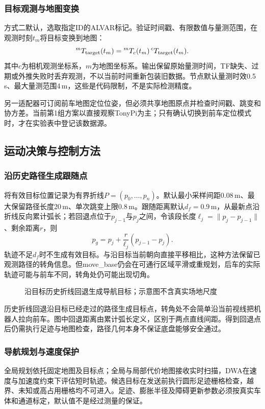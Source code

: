 \subsubsection{目标观测与地图变换}
方式二默认，选取指定ID的ALVAR标记。验证时间戳、有限数值与量测范围，在观测时刻$t_m$将目标变换到地图：
\begin{equation}
{}^{m}T_{\rm target}(t_m)
={}^mT_c(t_m)\,{}^cT_{\rm target}(t_m).
\end{equation}
其中$c$为相机观测坐标系，$m$为地图坐标系。输出保留原始量测时间，TF缺失、过期或外推失败时丢弃观测，不以当前时间重新包装旧数据。节点默认量测时效0.5\,s、最大量测范围4\,m，这些是代码限制，不是实际检测精度。

另一适配器可订阅前车地图定位位姿，但必须共享地图原点并检查时间戳、跳变和协方差。当前第1组方案以直接观察TonyPi为主；只有确认切换到前车定位模式时，才在实验表中登记该数据源。

\subsection{运动决策与控制方法}
\subsubsection{沿历史路径生成跟随点}
将有效目标位置记录为有界折线$P=(p_0,\dots,p_n)$。默认最小采样间距0.08\,m、最大保留路径长度20\,m、单次跳变上限0.8\,m。跟随距离默认$d_f=0.9$\,m，从最新点沿折线反向累计弧长；若回退点位于$p_{j-1}$与$p_j$之间，令该段长度$\ell_j=\|p_j-p_{j-1}\|$、剩余距离$r$，则
\begin{equation}
p_g=p_j+\frac{r}{\ell_j}(p_{j-1}-p_j).
\end{equation}
轨迹不足$d_f$时不生成有效目标。与沿目标当前朝向直接平移相比，这种方法保留已观测路径的转角信息。但move\_base仍会在可通行区域平滑或重规划，后车的实际轨迹可能与前车不同，转角处仍可能出现切角。
\begin{figure}[H]\centering

\caption{沿目标历史折线回退生成导航目标；示意图不含真实场地尺度}
\end{figure}

历史折线回退沿目标已经走过的路径生成目标点，转角处不会简单沿当前视线把机器人拉向前车。图中回退距离由累计弧长定义，区别于两点直线间距。得到回退点后仍需执行足迹与地图检查，路径几何本身不保证底盘能够安全通过。
\subsubsection{导航规划与速度保护}
全局规划依托固定地图及目标点；全局与局部代价地图接收实时扫描，DWA在速度与加速度约束下评估短时轨迹。候选目标在发送前执行圆形足迹栅格检查，越界、未知或高占用栅格均不可进入。足迹、膨胀半径及障碍更新参数必须按真实车体和通道标定，默认值不是经过测量的保证。

